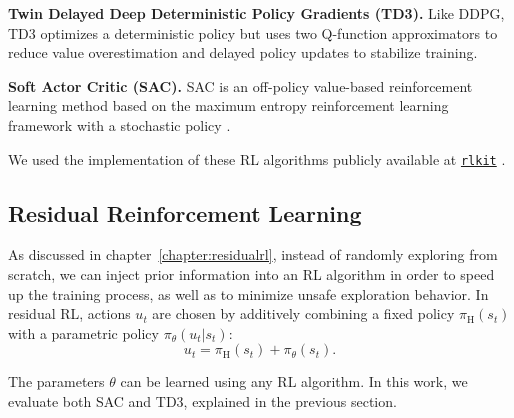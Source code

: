 \textbf{Twin Delayed Deep Deterministic Policy Gradients (TD3).} 
Like DDPG, TD3 optimizes a deterministic policy \citep{fujimoto2018td3} but uses two Q-function approximators to reduce value overestimation \cite{vanhasselt2016doubledqn} and delayed policy updates to stabilize training.

\textbf{Soft Actor Critic (SAC).}
SAC is an off-policy value-based reinforcement learning method based on the maximum entropy reinforcement learning framework with a stochastic policy \citep{haarnoja2018sac}.

We used the implementation of these RL algorithms publicly available at \href{https://github.com/vitchyr/rlkit}{\texttt{rlkit}} \citep{pong2018tdm}.

\subsection{Residual Reinforcement Learning}

As discussed in chapter~\ref{chapter:residualrl}, instead of randomly exploring from scratch, we can inject prior information into an RL algorithm in order to speed up the training process, as well as to minimize unsafe exploration behavior. In residual RL, actions $u_t$ are chosen by additively combining a fixed policy $\pi_\text{H}(s_t)$ with a parametric policy $\pi_\theta(u_t|s_t)$:
\begin{equation}\label{eq:ctrl_seq}
    u_t = \pi_\text{H}(s_t) + \pi_\theta(s_t).
\end{equation}

The parameters $\theta$ can be learned using any RL algorithm. In this work, we evaluate both SAC and TD3, explained in the previous section.



